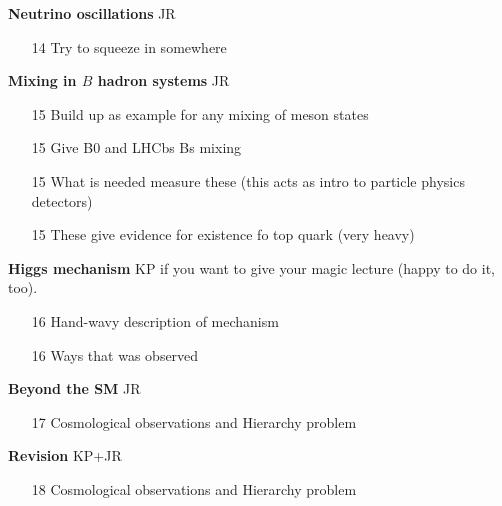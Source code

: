 {\bf Neutrino oscillations} JR
\begin{itemize}
\item[14] Try to squeeze in somewhere
\end{itemize}

{\bf Mixing in $B$ hadron systems} JR
\begin{itemize}
\item[15] Build up as example for any mixing of meson states
\item[15] Give B0 and LHCbs Bs mixing
\item[15] What is needed measure these (this acts as intro to particle physics detectors)
\item[15] These give evidence for existence fo top quark (very heavy)
\end{itemize}

{\bf Higgs mechanism} KP if you want to give your magic lecture (happy to do it, too).
\begin{itemize}
\item[16] Hand-wavy description of mechanism
\item[16] Ways that was observed
\end{itemize}

{\bf Beyond the SM} JR
\begin{itemize}
\item[17] Cosmological observations and Hierarchy problem
\end{itemize}

{\bf Revision} KP+JR
\begin{itemize}
\item[18] Cosmological observations and Hierarchy problem
\end{itemize}


